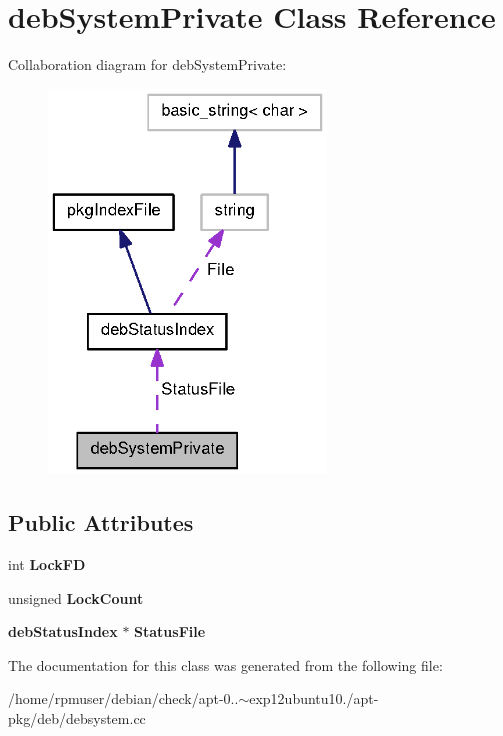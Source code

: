 \section{deb\-System\-Private \-Class \-Reference}
\label{classdebSystemPrivate}


\-Collaboration diagram for deb\-System\-Private\-:
\nopagebreak
\begin{figure}[H]
\begin{center}
\leavevmode
\includegraphics[width=209pt]{classdebSystemPrivate__coll__graph}
\end{center}
\end{figure}
\subsection*{\-Public \-Attributes}
\begin{DoxyCompactItemize}
\item 
int {\bfseries \-Lock\-F\-D}\label{classdebSystemPrivate_a96d2c013114049359ea86a124cfb0ab3}

\item 
unsigned {\bfseries \-Lock\-Count}\label{classdebSystemPrivate_a4ba1848c40aefd9b54adca2575810756}

\item 
{\bf deb\-Status\-Index} $\ast$ {\bfseries \-Status\-File}\label{classdebSystemPrivate_a7bba5521d130606ed917a004e468fbae}

\end{DoxyCompactItemize}


\-The documentation for this class was generated from the following file\-:\begin{DoxyCompactItemize}
\item 
/home/rpmuser/debian/check/apt-\/0..$\sim$exp12ubuntu10./apt-\/pkg/deb/debsystem.\-cc\end{DoxyCompactItemize}
